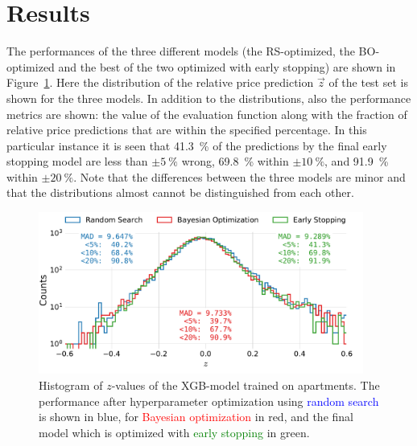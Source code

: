 \vspace{-0.5cm}


\FloatBarrier
\section{Results}
\label{sec:h:results}

The performances of the three different models (the RS-optimized, the BO-optimized and the best of the two optimized with early stopping) are shown in Figure~\ref{fig:h:CV_res_performance_ejer}. Here the distribution of the relative price prediction $\vec{z}$ of the test set is shown for the three models. In addition to the distributions, also the performance metrics are shown: the value of the evaluation function along with the fraction of relative price predictions that are within the specified percentage. In this particular instance it is seen that \SI{41.3}{\percent} of the predictions by the final early stopping model are less than $\pm\SI{5}{\percent}$ wrong, \SI{69.8}{\percent} within $\pm\SI{10}{\percent}$, and \SI{91.9}{\percent} within $\pm\SI{20}{\percent}$. Note that the differences between the three models are minor and that the distributions almost cannot be distinguished from each other. 

\begin{figure}[h!]
  \includegraphics[width=0.95\textwidth, trim=0 10 10 5, clip]{figures/housing/Ejerlejlighed_v19_cut_all_Ncols_all_xgb_z_hist_metrics.pdf}
  \caption[Performance of XGB-model for Apartments]
          {Histogram of $z$-values of the XGB-model trained on apartments. The performance after hyperparameter optimization using \textcolor{blue}{random search} is shown in blue, for \textcolor{red}{Bayesian optimization} in red, and the final model which is optimized with \textcolor{green}{early stopping} in green.
          } 
  \label{fig:h:CV_res_performance_ejer}
\end{figure}

